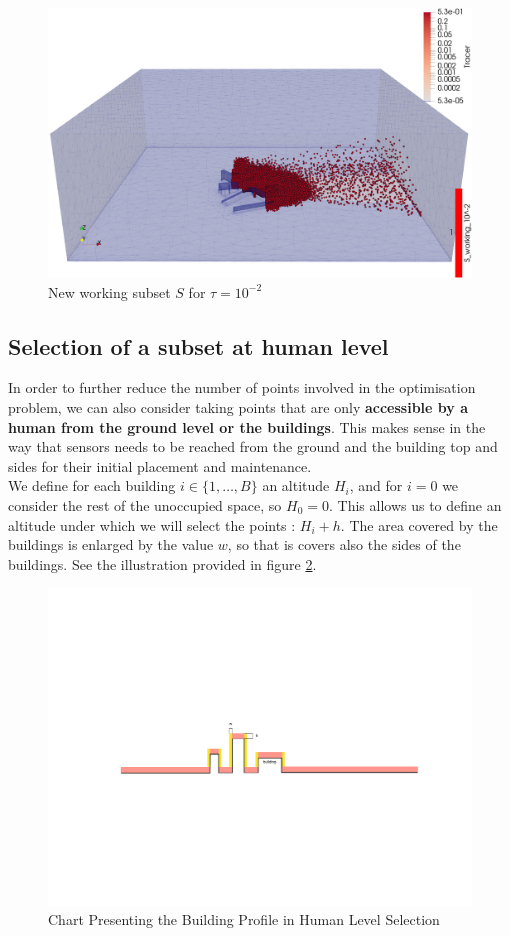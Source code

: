 \begin{figure}[h]
\centering
	\includegraphics[width = 0.8 \textwidth]{figures/Subset/working_subset_10^-2}
	\caption{New working subset $S$ for $\tau = 10^{-2}$}
	\label{fig:working_subset}
\end{figure}

\subsection{Selection of a subset at human level}

In order to further reduce the number of points involved in the optimisation problem, we can also consider taking points that are only \textbf{accessible by a human from the ground level or the buildings}. This makes sense in the way that sensors needs to be reached from the ground and the  building top and sides for their initial placement and maintenance. \\

We define for each building $i \in \{1, \dots, B\}$ an altitude $H_i$, and for $i = 0$ we consider the rest of the unoccupied space, so $H_0 = 0$. This allows us to define an altitude under which we will select the points : $H_i + h$. The area covered by the buildings is enlarged by the value $w$, so that is covers also the sides of the buildings. See the illustration provided in figure \ref{fig:humanchart}. \\

\begin{figure}[h]
\centering
	\includegraphics[width = 0.6 \textwidth]{figures/Subset/HumanSelection_chart}
	\caption{Chart Presenting the Building Profile in Human Level Selection}
	\label{fig:humanchart}
\end{figure}

